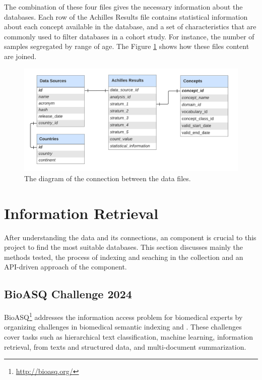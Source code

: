\hspace{1cm}

The combination of these four files gives the necessary information about the databases. Each row of the Achilles Results file contains statistical information about each concept available in the database, and a set of characteristics that are commonly used to filter databases in a cohort study. For instance, the number of samples segregated by range of age. The Figure \ref{fig_data_diagram} shows how these files content are joined.


\begin{figure}[H]
    \includegraphics[width=1\textwidth]{figs/chapter3/data_diagram.png}
    \centering
    \caption{The diagram of the connection between the data files.}
    \label{fig_data_diagram}
\end{figure}


\section{Information Retrieval}

After understanding the data and its connections, an {\ir} component is crucial to this project to find the most suitable databases. This section discusses mainly the {\ir} methods tested, the process of indexing and seaching in the collection and an API-driven approach of the {\ir} component.



\subsection{BioASQ Challenge 2024}

BioASQ\footnote{\url{http://bioasq.org/}} addresses the information access problem for biomedical experts by organizing challenges in biomedical semantic indexing and {\qa}. These challenges cover tasks such as hierarchical text classification, machine learning, information retrieval, {\qa} from texts and structured data, and multi-document summarization.

